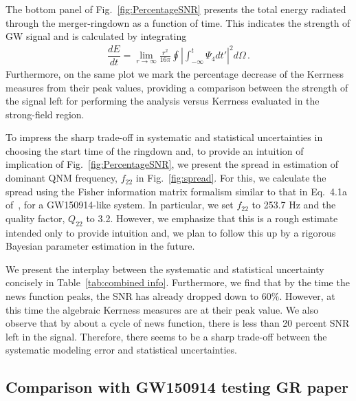 The bottom panel of Fig.~\ref{fig:PercentageSNR} presents the total energy radiated through the merger-ringdown as a function of time. This indicates the strength of GW signal and is calculated by integrating~\cite{Ruiz:2007yx}
\begin{align}
\label{eq:EnergyRad}
\dfrac{dE}{dt} = \lim_{r \to \infty} \frac{r^2}{16 \pi} \oint \left| {\int_{-\infty}^t \Psi_4 dt'}\right|^2 d \Omega \,.
\end{align}
Furthermore, on the same plot we mark the percentage decrease of the Kerrness measures from their peak values, providing a comparison between the strength of the signal left for performing the analysis versus Kerrness evaluated in the strong-field region. 

To impress the sharp trade-off in systematic and statistical uncertainties in choosing the start time of the ringdown and, to provide an intuition of implication of Fig.~\ref{fig:PercentageSNR}, we present the spread in estimation of dominant QNM frequency,  $f_{22}$ in Fig.~\ref{fig:spread}. For this, we calculate the spread using the Fisher information matrix formalism similar to that in Eq.~4.1a of~\cite{bertiparam}, for a GW150914-like system. In particular, we set $f_{22}$ to 253.7 Hz and the quality factor, $Q_{22}$ to 3.2. However, we emphasize that this is a rough estimate intended only to provide intuition and, we plan to follow this up by a rigorous Bayesian parameter estimation in the future.   



We present the interplay between the systematic and statistical uncertainty concisely in Table~\ref{tab:combined info}. 
Furthermore, we find that by the time the news function peaks, the SNR has already dropped down to $60 \%$. However, at this time the algebraic Kerrness measures are at their peak value. We also observe that by about a cycle of news function, there is less than 20 percent SNR left in the signal. Therefore, there seems to be a sharp trade-off between the systematic modeling error and statistical uncertainties.





\subsection{Comparison with GW150914 testing GR paper }
\label{sec:TestingGRComparison}

